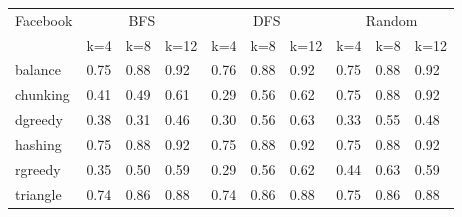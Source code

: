 \documentclass[12pt]{article}
\begin{document}
\begin{tabular}{llllllllll}
\toprule 
    Facebook & \multicolumn{3}{c}{BFS} & \multicolumn{3}{c}{DFS} & \multicolumn{3}{c}{Random}\\

    & k=4 & k=8 & k=12
    & k=4 & k=8 & k=12
     & k=4 & k=8 & k=12  \\
    \midrule
    balance &  0.75 & 0.88 	& 0.92 	& 0.76 	 &0.88 	& 0.92 	 &0.75 	& 0.88 	& 0.92       \\
chunking&	  0.41 	& 0.49 &	 0.61 &	 0.29 &	 0.56 &	 0.62 &	 0.75 &	 0.88 &	 0.92 \\
dgreedy&	  0.38 	& 0.31 &	 0.46 &	 0.30 &	 0.56 &	 0.63 &	 0.33 &	 0.55 &	 0.48  \\
hashing&	    0.75 	& 0.88 &	 0.92 &	 0.75 &	 0.88 &	 0.92 &	 0.75 &	 0.88 &	 0.92 \\
rgreedy&	    0.35 	& 0.50 &	 0.59 &	 0.29 &	 0.56 &	 0.62 &	 0.44 &	 0.63 &	 0.59 \\
triangle&	    0.74 	& 0.86 &	 0.88 &	 0.74 &	 0.86 &	 0.88 &	 0.75 &	 0.86 &	 0.88  \\
    \bottomrule
\end{tabular}
\end{document}
